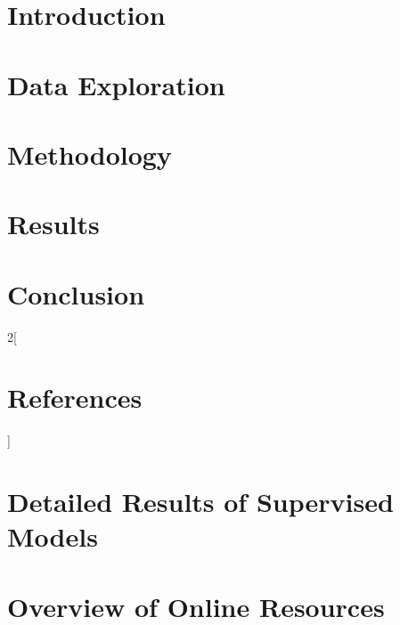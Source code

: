 \documentclass[NOTE, disdraft=false, UKenglish]{\DISCDTLATEXPATH UCLCDTDISdoc}
\begin{document}
\maketitle

\tableofcontents

\clearpage

\newpage
\section{Introduction}
\label{sec:introduction}


\section{Data Exploration}
\label{sec:data}


\section{Methodology}
\label{sec:methodology}


\section{Results}
\label{sec:results}


\section{Conclusion}
\label{sec:conclusion}


\newpage

\nocite{*}
\begin{multicols}{2}[\section*{References}]
\printbibliography[heading=none]
\end{multicols}

\begin{appendices}
	\section{Detailed Results of Supervised Models}
	\label{app:detailed-results}
	

	\section{Overview of Online Resources}
	\label{app:online-overview}
	
\end{appendices}
\end{document}
